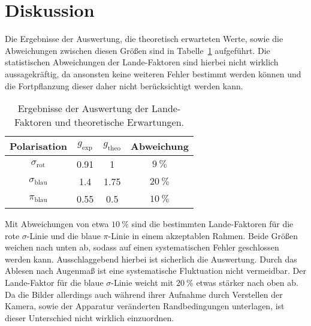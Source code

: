 \section{Diskussion}
\label{sec:diskussion}

Die Ergebnisse der Auswertung, die theoretisch erwarteten Werte, sowie die Abweichungen zwischen diesen Größen sind in Tabelle~\ref{tab:ergebnisse} aufgeführt. Die statistischen Abweichungen der Lande-Faktoren sind hierbei nicht wirklich aussagekräftig, da ansonsten keine weiteren Fehler bestimmt werden können und die Fortpflanzung dieser daher nicht berücksichtigt werden kann.
%
\begin{table}[H]
    \centering
    \caption{Ergebnisse der Auswertung der Lande-Faktoren und theoretische Erwartungen.}
    \begin{tabular}{cccc}
        \toprule
    {Polarisation}  & {$g_{\text{exp}}$}  & {$g_{\text{theo}}$} & {Abweichung} \\
		\midrule
	  $\sigma_\text{rot}$ & 0.91 & 1 & $\SI{9}{\percent}$ \\
    $\sigma_\text{blau}$ & 1.4 & 1.75 & $\SI{20}{\percent}$ \\
    $\pi_\text{blau}$ & 0.55 & 0.5 & $\SI{10}{\percent}$ \\
		\bottomrule
	\end{tabular}
    \label{tab:ergebnisse}
\end{table}
%
Mit Abweichungen von etwa $\SI{10}{\percent}$ sind die bestimmten Lande-Faktoren für die rote $\sigma$-Linie und die blaue $\pi$-Linie in einem akzeptablen Rahmen. Beide Größen weichen nach unten ab, sodass auf einen systematischen Fehler geschlossen werden kann. Ausschlaggebend hierbei ist sicherlich die Auswertung. Durch das Ablesen nach Augenmaß ist eine systematische Fluktuation nicht vermeidbar. Der Lande-Faktor für die blaue $\sigma$-Linie weicht mit $\SI{20}{\percent}$ etwas stärker nach oben ab. Da die Bilder allerdings auch während ihrer Aufnahme durch Verstellen der Kamera, sowie der Apparatur veränderten Randbedingungen unterlagen, ist dieser Unterschied nicht wirklich einzuordnen.
